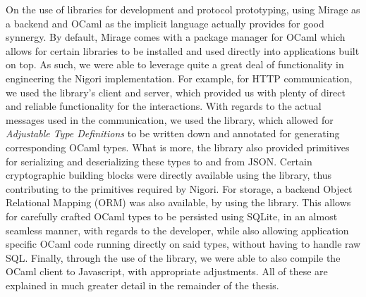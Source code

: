 
On the use of libraries for development and protocol prototyping, using Mirage as a backend and OCaml as the implicit language actually provides for good synnergy.
By default, Mirage comes with a package manager for OCaml which allows for certain libraries to be installed and used directly into applications built on top.
As such, we were able to leverage quite a great deal of functionality in engineering the Nigori implementation.
For example, for HTTP communication, we used the  library's client and server, which provided us with plenty of direct and reliable functionality for the interactions.
With regards to the actual messages used in the communication, we used the  library, which allowed for \textit{Adjustable Type Definitions} to be written down and annotated for generating corresponding OCaml types.
What is more, the library also provided primitives for serializing and deserializing these types to and from JSON.
Certain cryptographic building blocks were directly available using the  library, thus contributing to the primitives required by Nigori.
For storage, a backend Object Relational Mapping (ORM) was also available, by using the  library.
This allows for carefully crafted OCaml types to be persisted using SQLite, in an almost seamless manner, with regards to the developer, while also allowing application specific OCaml code running directly on said types, without having to handle raw SQL.
Finally, through the use of the  library, we were able to also compile the OCaml client to Javascript, with appropriate adjustments.
All of these are explained in much greater detail in the remainder of the thesis.
